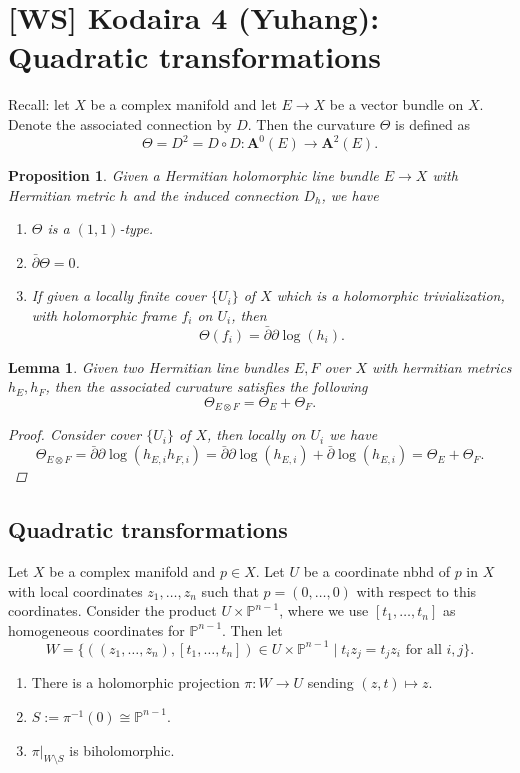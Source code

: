 \documentclass[12pt]{article}
\theoremstyle{darkgreentheorem}
\newtheorem{lm}[thm]{Lemma}
\newtheorem{prop}[thm]{Proposition}
\theoremstyle{darkbluedefinition}
\theoremstyle{darkredexample}
\theoremstyle{remark}
\newcommand{\1}{\mathbbm{1}}
\renewcommand{\P}{\mathbb{P}}
\newcommand{\A}{\mathbf{A}}
\newcommand{\ot}{\otimes}
\newcommand{\tms}{\times}
\begin{document}
\section{[WS] Kodaira 4 (Yuhang): Quadratic transformations}

Recall: let $X$ be a complex manifold and let $E\to X$ be a vector bundle on $X$.
Denote the associated connection by $D$.
Then the curvature $\Theta$ is defined as
\[ \Theta = D^{2} =D\circ D\colon \A^{0}(E)\to \A^{2}(E). \]

\begin{prop}
    Given a Hermitian holomorphic line bundle $E\to X$ with Hermitian metric $h$ and the induced connection $D_{h}$, we have
    \begin{enumerate}
	\item $\Theta$ is a $(1,1)$-type.
	\item $\bar{\partial} \Theta =0$.
	\item If given a locally finite cover $\{U_{i}\}$ of $X$ which is a holomorphic trivialization, with holomorphic frame $f_{i}$ on $U_{i}$, then
	    \[ \Theta(f_{i})=\bar{\partial}\partial \log(h_{i}). \]
    \end{enumerate}
\end{prop}

\begin{lm}
    Given two Hermitian line bundles $E,F$ over $X$ with hermitian metrics $h_{E},h_{F}$, then the associated curvature satisfies the following
    \[ \Theta_{E\ot F}=\Theta_{E}+\Theta_{F}. \]
    \begin{proof}
	Consider cover $\{U_{i}\}$ of $X$, then locally on $U_{i}$ we have
	\[ \Theta_{E\ot F}=\bar{\partial}\partial \log(h_{E,i}h_{F,i})=\bar{\partial}\partial \log(h_{E,i})+\bar{\partial}\log(h_{E,i})=\Theta_{E}+\Theta_{F}.\]
    \end{proof}
\end{lm}

\subsection{Quadratic transformations}

Let $X$ be a complex manifold and $p\in X$.
Let $U$ be a coordinate nbhd of $p$ in $X$ with local coordinates $z_{1},\ldots,z_{n}$ such that $p=(0,\ldots,0)$ with respect to this coordinates.
Consider the product $U\tms \P^{n-1}$, where we use $[t_{1},\ldots,t_{n}]$ as homogeneous coordinates for $\P^{n-1}$.
Then let
\[ W=\{ ((z_{1},\ldots,z_{n}),[t_{1},\ldots,t_{n}])\in U\tms \P^{n-1} \mid t_{i}z_{j}=t_{j}z_{i} \text{ for all } i,j\}.\]
\begin{enumerate}
    \item There is a holomorphic projection $\pi\colon W\to U$ sending $(z,t)\mapsto z$.
    \item $S:=\pi^{-1}(0)\cong \P^{n-1}$.
    \item $\pi|_{W\setminus S}$ is biholomorphic.
\end{enumerate}
\end{document}
